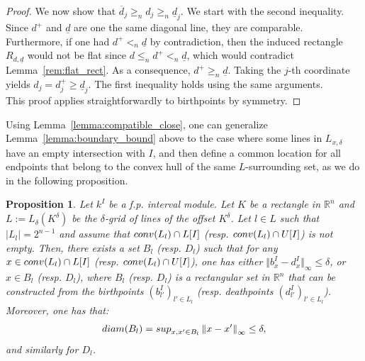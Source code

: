 \documentclass{article}
\newcommand{\norm}[1]{\left\lVert #1 \right\rVert}
\newcommand{\conv}[1]{ {\rm conv}(#1) }
\newcommand{\R}{\mathbb{R}}
\newcommand{\leqn}{\leq_n}
\newcommand{\geqn}{\geq_n}
\newcommand{\sln}{<_n}
\newcommand{\upperb}[1]{ U[#1] }
\newcommand{\lowerb}[1]{ L[#1] }
\newcommand{\rectangle}[2]{ R_{#1, #2} }
\newtheorem{proposition}[theorem]{Proposition}%
\begin{document}
\begin{proof}
	 We now show that $\overline{d}_j \geqn
	d_j \geqn \underline{d}_j$. We start with the second inequality. Since $d^+$
	and $\underline{d}$ are one the same diagonal line, they are comparable.
	Furthermore, if one had $d^+ \sln \underline{d}$ by contradiction, then the induced rectangle $\rectangle{d}{\underline{d}}$ would not be flat since $d \leqn d^+ \sln \underline{d}$,
	which would contradict Lemma~\ref{rem:flat_rect}.
	As a consequence, $d^+ \geqn \underline{d}$. Taking the $j$-th coordinate yields $d_j = d^+_j \ge \underline{d}_j$. The first inequality holds
	using the same arguments. \\

	This proof applies straightforwardly to birthpoints by symmetry.
\end{proof}

Using Lemma~\ref{lemma:compatible_close}, one can generalize Lemma~\ref{lemma:boundary_bound} above to the case where
some lines in $L_{x,\delta}$ have an empty intersection with $I$, and then define a common location for all endpoints that belong to the
convex hull of the same $L$-surrounding set, as we do in the following proposition. \\

\begin{proposition}\label{prop:local_bound}
	Let ${k^{I}}$ be a {f.p.} interval module. Let $K$ be a rectangle in $\R^n$ and $L:=L_\delta(K^\delta)$ be the $\delta$-grid of lines of the offset $K^\delta$.
	Let $l\in L$ such that $|L_l| = 2^{n-1}$ and assume that $\conv{L_l} \cap \lowerb{I}$ (resp. $\conv{L_l} \cap \upperb{I}$) is not empty.
	Then, there exists a set $B_l$ (resp. $D_l$) such that for any $x\in \conv{L_l} \cap \lowerb{I}$ (resp. $\conv{L_l} \cap \upperb{I}$),
	one has either  $\Vert b_x^I -d_x^I \Vert_\infty \le \delta$, or
	$x \in B_l$ (resp. $D_l$), where $B_l$ (resp. $D_l$) is a rectangular set in
	$\R^n$ that can be constructed from the birthpoints $(b_{l'}^I)_{l'\in L_l}$  (resp. deathpoints $(d_{l'}^I)_{l'\in L_l}$). %
	Moreover, one has that:
	\begin{equation}\label{eq:diam}
		{\rm diam}(B_l)={\rm sup}_{x,x'\in B_l}\norm{x-x'}_\infty \leq \delta,
	\end{equation}
	and similarly for $D_l$. %

\end{proposition}
\end{document}

